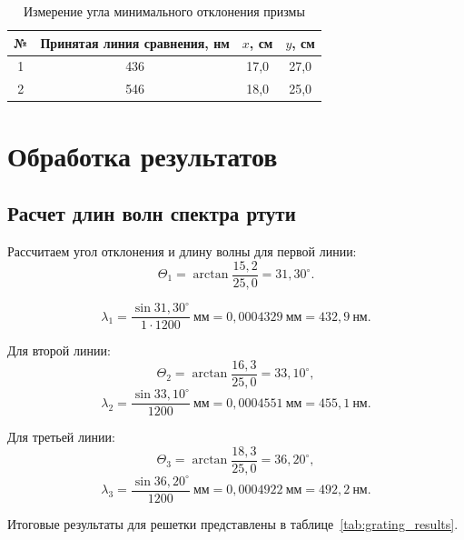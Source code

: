 \documentclass[a4paper,12pt]{article}
\begin{document}
\begin{table}[H]
\centering
\caption{Измерение угла минимального отклонения призмы}
\begin{tabular}{|c|c|c|c|}
\hline
№ & Принятая линия сравнения, нм & $x$, см & $y$, см \\
\hline
1 & 436 & 17{,}0 & 27{,}0 \\
\hline
2 & 546 & 18{,}0 & 25{,}0 \\
\hline
\end{tabular}
\end{table}

\section{Обработка результатов}

\subsection{Расчет длин волн спектра ртути}

Рассчитаем угол отклонения и длину волны для первой линии:
\begin{equation}
    \Theta_1 = \arctan\frac{15{,}2}{25{,}0}=31{,}30^\circ.
\end{equation}

\begin{equation}
    \lambda_1 = \frac{\sin 31{,}30^\circ}{1\cdot 1200}~\text{мм}
    =0{,}0004329~\text{мм}=432{,}9~\text{нм}.
\end{equation}

Для второй линии:
\begin{equation}
    \Theta_2 = \arctan\frac{16{,}3}{25{,}0}=33{,}10^\circ,
\end{equation}
\begin{equation}
    \lambda_2 = \frac{\sin 33{,}10^\circ}{1200}~\text{мм}
    =0{,}0004551~\text{мм}=455{,}1~\text{нм}.
\end{equation}

Для третьей линии:
\begin{equation}
    \Theta_3 = \arctan\frac{18{,}3}{25{,}0}=36{,}20^\circ,
\end{equation}
\begin{equation}
    \lambda_3 = \frac{\sin 36{,}20^\circ}{1200}~\text{мм}
    =0{,}0004922~\text{мм}=492{,}2~\text{нм}.
\end{equation}

Итоговые результаты для решетки представлены в таблице~\ref{tab:grating_results}.
\end{document}

